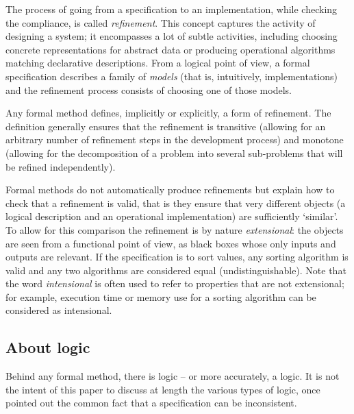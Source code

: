 \documentclass[conference]{IEEEtran}
\begin{document}
The process of going from a specification to an implementation, while checking the compliance,
is called \emph{refinement}. This concept captures the activity of designing a system; it
encompasses a lot of subtle activities, including choosing concrete representations for
abstract data or producing operational algorithms matching declarative descriptions. From a
logical point of view, a formal specification describes a family of \emph{models} (that is,
intuitively, implementations) and the refinement process consists of choosing one of those
models.

Any formal method defines, implicitly or explicitly, a form of refinement. The definition
generally ensures that the refinement is transitive (allowing for an arbitrary number of
refinement steps in the development process) and monotone (allowing for the decomposition of a
problem into several sub-problems that will be refined independently).

Formal methods do not automatically produce refinements but explain how to check that a
refinement is valid, that is they ensure that very different objects (a logical description
and an operational implementation) are sufficiently `similar'. To allow for this comparison
the refinement is by nature \emph{extensional}: the objects are seen from a functional point
of view, as black boxes whose only inputs and outputs are relevant. If the specification is to
sort values, any sorting algorithm is valid and any two algorithms are considered equal
(undistinguishable). Note that the word \emph{intensional} is often used to refer to properties
that are not extensional; for example, execution time or memory use for a sorting algorithm
can be considered as intensional.

\subsection{About logic}\label{logic}

Behind any formal method, there is logic -- or more accurately, a logic. It is not the intent
of this paper to discuss at length the various types of logic, once pointed out the common
fact that a specification can be inconsistent.
\end{document}
